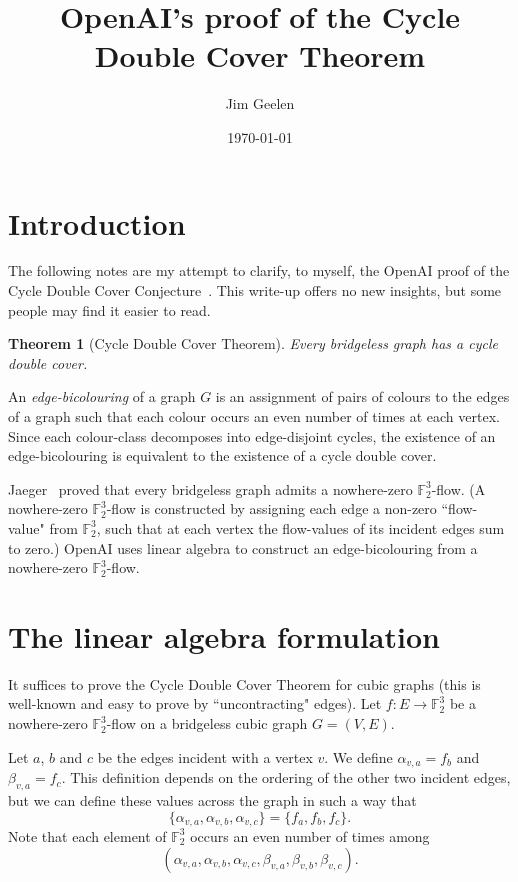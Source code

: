 \documentclass[12pt,reqno]{amsart}
\newtheorem{theorem}{Theorem}[section]
\newcommand{\bF}{\mathbb F}
\begin{document}
\sloppy


\title{OpenAI's proof of the Cycle Double Cover Theorem}

\author{Jim Geelen}

\date{\today}


\maketitle



\section{Introduction}

The following notes are my attempt to clarify, to myself, the OpenAI proof of the Cycle Double Cover Conjecture~\cite{OpenAI}.
This write-up offers no new insights, but some people may find it easier to read.
\begin{theorem}[Cycle Double Cover Theorem]
Every bridgeless graph has a cycle double cover.
\end{theorem}

An {\em edge-bicolouring} of a graph $G$ is an assignment of pairs of colours to the edges of a graph such that each colour occurs an even number of times at each vertex. Since each colour-class decomposes into edge-disjoint cycles,
the existence of an edge-bicolouring is equivalent to the existence of a cycle double cover.

Jaeger~\cite{Jaeger} proved that every bridgeless graph admits a nowhere-zero $\bF_2^3$-flow.
(A nowhere-zero $\bF_2^3$-flow is constructed by assigning each edge a non-zero ``flow-value" from $\bF_2^3$, such that at each vertex the flow-values of its incident edges sum to zero.)
OpenAI uses linear algebra to construct an edge-bicolouring from a nowhere-zero $\bF_2^3$-flow. 

\section{The linear algebra formulation}

It suffices to prove the Cycle Double Cover Theorem for cubic graphs (this is well-known and easy to prove by ``uncontracting" edges).
Let $f:E\rightarrow \bF_2^3$ be a nowhere-zero $\bF_2^3$-flow on a bridgeless cubic graph $G=(V,E)$. 

Let $a$, $b$ and $c$ be the edges incident with a vertex $v$. We define
$\alpha_{v,a}=f_b$ and $\beta_{v,a}=f_c$.
This definition depends on the ordering of the other two incident edges, but we can define these values across the graph in such a way that
$$\{\alpha_{v,a},\alpha_{v,b},\alpha_{v,c}\} = \{f_a,f_b,f_c\}.$$
Note that each element of $\bF_2^3$ occurs an even number of times among
$$ (\alpha_{v,a},\alpha_{v,b},\alpha_{v,c},\beta_{v,a},\beta_{v,b},\beta_{v,c}).$$
\end{document}
